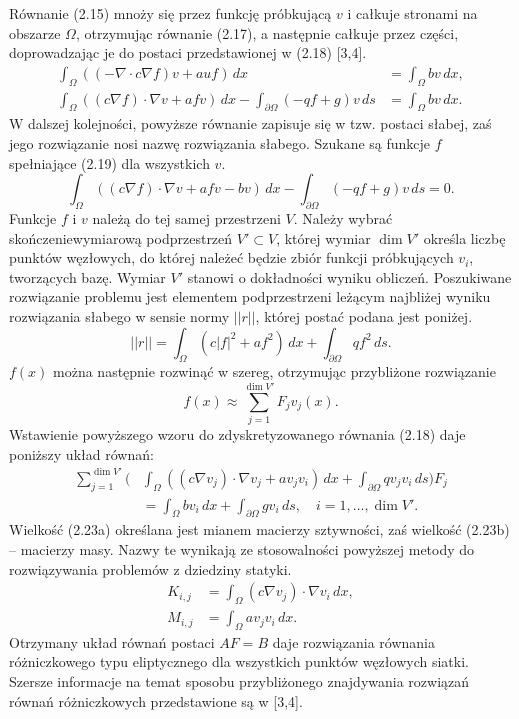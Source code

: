 \documentclass[12pt,a4paper]{article}
\begin{document}
Równanie (2.15) mnoży się przez funkcję próbkującą $v$ i całkuje stronami na obszarze $\Omega$,
otrzymując równanie (2.17), a następnie całkuje przez części, doprowadzając je do postaci
przedstawionej w (2.18) [3,4].
\begin{align}
\int_\Omega\left((-\nabla\cdot c\nabla f)v+auf\right)\,dx &= \int_\Omega bv\,dx, \tag{2.17}\\
\int_\Omega\left((c\nabla f)\cdot\nabla v+afv\right)\,dx-\int_{\partial\Omega}(-qf+g)v\,ds &= \int_\Omega bv\,dx. \tag{2.18}
\end{align}
W dalszej kolejności, powyższe równanie zapisuje się w tzw. postaci słabej, zaś jego rozwiązanie
nosi nazwę rozwiązania słabego. Szukane są funkcje $f$ spełniające (2.19) dla wszystkich $v$.
\begin{equation}
\int_\Omega\left((c\nabla f)\cdot\nabla v+afv-bv\right)\,dx-\int_{\partial\Omega}(-qf+g)v\,ds=0. \tag{2.19}
\end{equation}
Funkcje $f$ i $v$ należą do tej samej przestrzeni $V$. Należy wybrać skończeniewymiarową
podprzestrzeń $V'\subset V$, której wymiar $\dim V'$ określa liczbę punktów węzłowych, do której należeć
będzie zbiór funkcji próbkujących $v_i$, tworzących bazę. Wymiar $V'$ stanowi o dokładności wyniku
obliczeń. Poszukiwane rozwiązanie problemu jest elementem podprzestrzeni leżącym najbliżej
wyniku rozwiązania słabego w sensie normy $||r||$, której postać podana jest poniżej.
\begin{equation}
||r||=\int_\Omega(c|f|^2+af^2)\,dx+\int_{\partial\Omega}qf^2\,ds. \tag{2.20}
\end{equation}
$f(x)$ można następnie rozwinąć w szereg, otrzymując przybliżone rozwiązanie
\begin{equation}
f(x)\approx\sum_{j=1}^{\dim V'}F_jv_j(x). \tag{2.21}
\end{equation}
Wstawienie powyższego wzoru do zdyskretyzowanego równania (2.18) daje poniższy układ
równań:
\begin{equation}
\begin{aligned}
\sum_{j=1}^{\dim V'}\bigg(&\int_\Omega\left((c\nabla v_j)\cdot\nabla v_j+av_jv_i\right)\,dx
+\int_{\partial\Omega}qv_jv_i\,ds\bigg)F_j \\
&=\int_\Omega bv_i\,dx+\int_{\partial\Omega}gv_i\,ds,\quad i=1,\ldots,\dim V'.
\end{aligned}
\tag{2.22}
\end{equation}
Wielkość (2.23a) określana jest mianem macierzy sztywności, zaś wielkość (2.23b) -- macierzy
masy. Nazwy te wynikają ze stosowalności powyższej metody do rozwiązywania problemów z
dziedziny statyki.
\begin{align}
K_{i,j} &= \int_\Omega(c\nabla v_j)\cdot\nabla v_i\,dx, \tag{2.23a}\\
M_{i,j} &= \int_\Omega av_jv_i\,dx. \tag{2.23b}
\end{align}
Otrzymany układ równań postaci $AF=B$ daje rozwiązania równania różniczkowego typu
eliptycznego dla wszystkich punktów węzłowych siatki. Szersze informacje na temat sposobu
przybliżonego znajdywania rozwiązań równań różniczkowych przedstawione są w [3,4].
\end{document}
